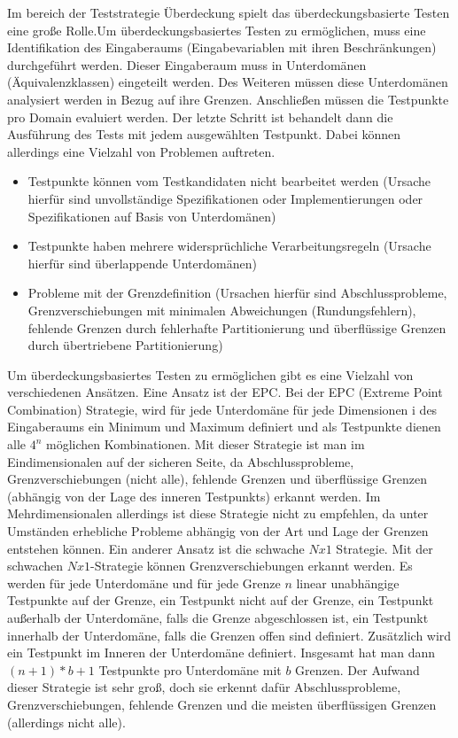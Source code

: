 Im bereich der Teststrategie Überdeckung spielt das überdeckungsbasierte Testen eine große Rolle.Um überdeckungsbasiertes Testen zu ermöglichen, muss eine Identifikation des  Eingaberaums (Eingabevariablen mit ihren Beschränkungen) durchgeführt werden. Dieser Eingaberaum muss in Unterdomänen (Äquivalenzklassen) eingeteilt werden. Des Weiteren müssen diese Unterdomänen analysiert werden in Bezug auf ihre Grenzen. Anschließen müssen die Testpunkte pro Domain evaluiert werden.
Der letzte Schritt ist behandelt dann die Ausführung des Tests mit jedem ausgewählten Testpunkt. Dabei können allerdings eine Vielzahl von Problemen auftreten.
\begin{itemize}
\item Testpunkte können vom Testkandidaten nicht bearbeitet werden (Ursache hierfür sind unvollständige Spezifikationen oder Implementierungen oder Spezifikationen auf Basis von Unterdomänen)
\item Testpunkte haben mehrere widersprüchliche Verarbeitungsregeln (Ursache hierfür sind überlappende Unterdomänen)
\item Probleme mit der Grenzdefinition (Ursachen hierfür sind Abschlussprobleme, Grenzverschiebungen mit minimalen Abweichungen (Rundungsfehlern), fehlende Grenzen durch fehlerhafte Partitionierung und überflüssige Grenzen durch übertriebene Partitionierung)
\end{itemize}

Um überdeckungsbasiertes Testen zu ermöglichen gibt es eine Vielzahl von verschiedenen Ansätzen.
Eine Ansatz ist der EPC. Bei der EPC (Extreme Point Combination) Strategie, wird für jede Unterdomäne für jede Dimensionen i des Eingaberaums ein Minimum und Maximum definiert und als Testpunkte dienen alle $4^n$ möglichen Kombinationen. 
Mit dieser Strategie ist man im Eindimensionalen auf der sicheren Seite, da Abschlussprobleme, Grenzverschiebungen (nicht alle), fehlende Grenzen und überflüssige Grenzen (abhängig von der Lage des inneren Testpunkts) erkannt werden. Im Mehrdimensionalen allerdings ist diese Strategie nicht zu empfehlen, da unter Umständen erhebliche Probleme abhängig von der Art und Lage der Grenzen entstehen können.
\linebreak
Ein anderer Ansatz ist die schwache $Nx1$ Strategie. Mit der schwachen $Nx1$-Strategie können Grenzverschiebungen erkannt werden. Es werden für jede Unterdomäne und für jede Grenze $n$ linear unabhängige Testpunkte auf der Grenze, ein Testpunkt nicht auf der Grenze, ein Testpunkt außerhalb der Unterdomäne, falls die Grenze abgeschlossen ist, ein Testpunkt innerhalb der Unterdomäne, falls die Grenzen offen sind definiert. Zusätzlich wird ein Testpunkt im Inneren der Unterdomäne definiert. Insgesamt hat man dann $(n+1)*b+1$ Testpunkte pro Unterdomäne mit $b$ Grenzen. Der Aufwand dieser Strategie ist sehr groß, doch sie erkennt dafür Abschlussprobleme, Grenzverschiebungen, fehlende Grenzen und die meisten überflüssigen Grenzen (allerdings nicht alle).